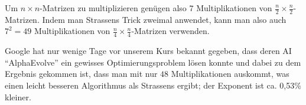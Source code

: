 \begin{sheet}
    \begin{remark}
        Um $n\times n$-Matrizen zu multiplizieren genügen also $7$ Multiplikationen von $\frac{n}{2}\times\frac{n}{2}$-Matrizen. Indem man Strassens Trick zweimal anwendet, kann man also auch $7^2=49$ Multiplikationen von $\frac{n}{4}\times\frac{n}{4}$-Matrizen verwenden.

        Google hat nur wenige Tage vor unserem Kurs bekannt gegeben, dass deren AI \enquote{AlphaEvolve} ein gewisses Optimierungsproblem lösen konnte und dabei zu dem Ergebnis gekommen ist, dass man mit nur $48$ Multiplikationen auskommt, was einen leicht besseren Algorithmus als Strassens ergibt; der Exponent ist ca. 0,53\% kleiner. \cite{googleAlphaEvolve}
    \end{remark}

\end{sheet}